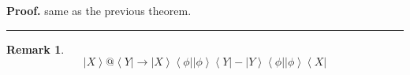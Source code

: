\documentclass[aps,preprint]{revtex4}%
\newtheorem{remark}[theorem]{Remark}
\newenvironment{proof}[1][Proof]{\noindent\textbf{#1.} }{\ \rule{0.5em}{0.5em}}
\begin{document}
\begin{proof}
same as the previous theorem. 
\end{proof}

\begin{remark}%
\begin{equation}
\left\vert X\right\rangle @\left\langle Y\right\vert \rightarrow\left\vert
X\right\rangle \left\langle \phi\right\vert \left\vert \phi\right\rangle
\left\langle Y\right\vert -\left\vert Y\right\rangle \left\langle
\phi\right\vert \left\vert \phi\right\rangle \left\langle X\right\vert
\end{equation}

\end{remark}
\end{document}
